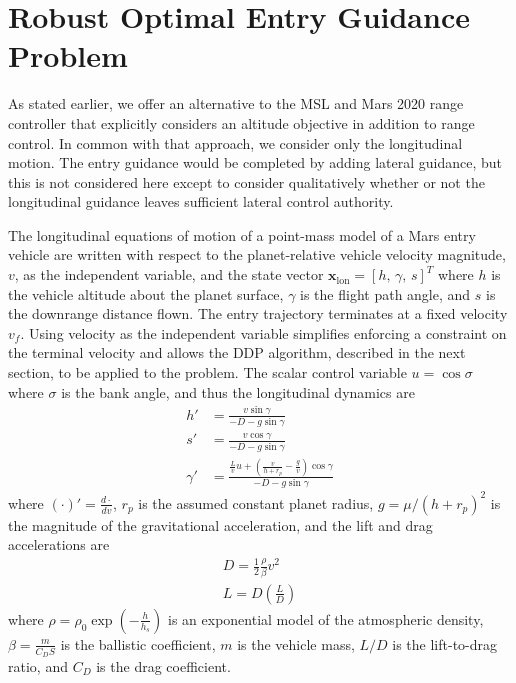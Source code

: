 \documentclass[journal ]{new-aiaa}
\newcommand{\state}{\ensuremath{\mathbf{x}}}
\begin{document}
\section*{Robust Optimal Entry Guidance Problem}
As stated earlier, we offer an alternative to the MSL and Mars 2020 range controller that explicitly considers an altitude objective in addition to range control. In common with that approach, we consider only the longitudinal motion. The entry guidance would be completed by adding lateral guidance, but this is not considered here except to consider qualitatively whether or not the longitudinal guidance leaves sufficient lateral control authority.

The longitudinal equations of motion of a point-mass model of a Mars entry vehicle are written with respect to the planet-relative vehicle velocity magnitude, $v$, as the independent variable, and the state vector $\state_{\mathrm{lon}}=[h,\,\gamma,\, s]^T$ where $h$ is the vehicle altitude about the planet surface, $\gamma$ is the flight path angle, and $s$ is the downrange distance flown. The entry trajectory terminates at a fixed velocity $v_f$. Using velocity as the independent variable simplifies enforcing a constraint on the terminal velocity and allows the DDP algorithm, described in the next section, to be applied to the problem. The scalar control variable $u=\cos\sigma$ where $\sigma$ is the bank angle, and thus the longitudinal dynamics are
\begin{align}
h' &= \frac{v\sin\gamma}{-D - g\sin\gamma} \label{eq_dynamics_altitude}\\
s' &= \frac{v\cos\gamma}{-D - g\sin\gamma} \\
\gamma' &= \frac{\frac{L}{v}u + \left(\frac{v}{h+r_p}-\frac{g}{v}\right)\cos\gamma}{-D - g\sin\gamma} \label{eq_dynamics_fpa}
\end{align}
where $(\cdot)' = \frac{d\cdot}{dv}$, $r_p$ is the assumed constant planet radius, $g=\mu/(h+r_p)^2$ is the magnitude of the gravitational acceleration, and the lift and drag accelerations are
\begin{align}
D = \frac{1}{2}\frac{\rho}{\beta} v^2 \\
L = D(\frac{L}{D})
\end{align}
where $\rho=\rho_0\exp\left(-\frac{h}{h_s}\right)$ is an exponential model of the atmospheric density, $\beta=\frac{m}{C_DS}$ is the ballistic coefficient, $m$ is the vehicle mass, $L/D$ is the lift-to-drag ratio, and $C_D$ is the drag coefficient.
\end{document}
